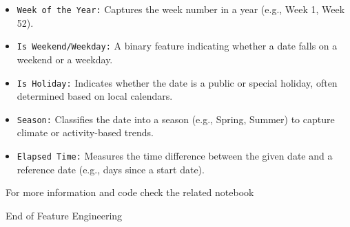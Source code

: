 \documentclass[serif, aspectratio=169]{beamer}
\begin{document}
\begin{frame}
    \begin{itemize}
        \item \texttt{\color{purple}Week of the Year:} Captures the week number in a year (e.g., Week 1, Week 52).
        \item \texttt{\color{purple}Is Weekend/Weekday:} A binary feature indicating whether a date falls on a weekend or a weekday.
        \item \texttt{\color{purple}Is Holiday:} Indicates whether the date is a public or special holiday, often determined based on local calendars.
        \item \texttt{\color{purple}Season:} Classifies the date into a season (e.g., Spring, Summer) to capture climate or activity-based trends.
        \item \texttt{\color{purple}Elapsed Time:} Measures the time difference between the given date and a reference date (e.g., days since a start date).
    \end{itemize}
\end{frame}


\begin{frame}
    \begin{center}
        {\Huge\ \color{red}For more information and code check the related notebook}
    \end{center}
\end{frame}


\begin{frame}
    \begin{center}
        {\Huge\ End of Feature Engineering}
    \end{center}
\end{frame}
\end{document}
